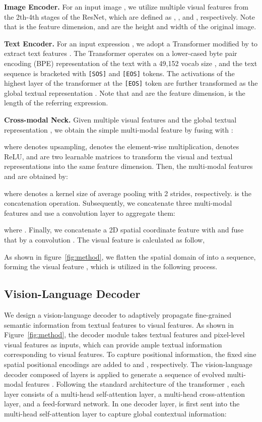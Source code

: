 \documentclass[10pt,twocolumn,letterpaper]{article}
\begin{document}
\textbf{Image Encoder.} 
For an input image , we utilize multiple visual features from the 2th-4th stages of the ResNet,
which are defined as , , and , respectively.
Note that  is the feature dimension,  and  are the height and width of the original image.

\textbf{Text Encoder.}
For an input expression , we adopt a Transformer \cite{vaswani2017attention} modified by \cite{radford2019language} to extract text features .
The Transformer operates on a lower-cased byte pair encoding (BPE) representation of the text with a 49,152 vocab size \cite{sennrich2015neural},
and the text sequence is bracketed with \texttt{[SOS]} and \texttt{[EOS]} tokens.
The activations of the highest layer of the transformer at the \texttt{[EOS]} token are further transformed as the global textual representation .
Note that  and  are the feature dimension,  is the length of the referring expression.

\textbf{Cross-modal Neck.}
Given multiple visual features and the global textual representation , we obtain the simple multi-modal feature  by fusing  with :

where  denotes  upsampling,  denotes the element-wise multiplication,  denotes ReLU,  and  are two learnable matrices to transform the visual and textual representations into the same feature dimension.
Then, the multi-modal features  and  are obtained by:

where  denotes a kernel size of  average pooling with 2 strides, respectively.  is the concatenation operation.
Subsequently, we concatenate three multi-modal features and use a  convolution layer to aggregate them:

where .
Finally, we concatenate a 2D spatial coordinate feature  with  and fuse that by a  convolution \cite{liu2018coordconv}. The visual feature  is calculated as follow,

As shown in figure~\ref{fig:method}, we flatten the spatial domain of  into a sequence, forming the visual feature , which is utilized in the following process.

\subsection{Vision-Language Decoder}
We design a vision-language decoder to adaptively propagate fine-grained semantic information from textual features to visual features.
As shown in Figure~\ref{fig:method}, the decoder module takes textual features  and pixel-level visual features  as inputs, which can provide ample textual information corresponding to visual features.
To capture positional information, the fixed sine spatial positional encodings are added to  \cite{carion2020end} and  \cite{vaswani2017attention}, respectively.
The vision-language decoder composed of  layers is applied to generate a sequence of evolved multi-modal features .
Following the standard architecture of the transformer \cite{vaswani2017attention}, each layer consists of a multi-head self-attention layer, a multi-head cross-attention layer, and a feed-forward network.
In one decoder layer,  is first sent into the multi-head self-attention layer to capture global contextual information:
\end{document}
